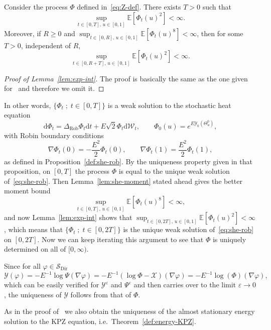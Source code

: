 \documentclass[AHL,Unicode,longabstracts]{cedram}
\DeclareMathOperator{\Dir}{Dir}
\DeclareMathOperator{\Rob}{Rob}
\newcommand{\bb}[1]{{\mathbb #1}}
\newcommand{\mc}[1]{{\mathcal #1}}
\renewcommand{\mc}[1]{{\mathcal #1}}
\newcommand{\Ctwo}{\ensuremath{\mc S_{\Dir}}}
\renewcommand{\ge}{\geqslant}
\newcommand*{\dd}{\mathrm{d}}
\newcommand*{\dt}{\dd t}
\begin{document}
\begin{lemm}\label{lem:exp-int}
Consider the process $\Phi$ defined in~\eqref{eq:Z-def}. There exists $T>0$ such that
\[
\sup_{t \in [0,T], \, u\in [0,1]}\bb E[\Phi_t(u)^2] < \infty.
\]
Moreover, if $R\ge 0$ and $\sup_{t \in [0,R], \, u\in [0,1]} \bb E[\Phi_t(u)^{8}] < \infty$, then for some $T > 0$, independent of $R$,
\[
\sup_{t \in [0,R+T], \, u\in [0,1]} \bb E[\Phi_t(u)^{2}] < \infty.
\]
\end{lemm}

\begin{proof}[Proof of Lemma~\ref{lem:exp-int}]
The proof is basically the same as the one given for~\cite[Lemma~B.1]{Gubinelli2015Energy} and therefore we omit it.
\end{proof}

In other words, $\{\Phi_t \; ; \; t \in [0,T]\}$ is a weak solution to the stochastic heat equation
\[
\dd \Phi_t = \Delta_{\Rob} \Phi_t \dt + E \sqrt{2} \Phi_t \dd \mc W_t, \qquad \Phi_0 (u) = e^{E \mc Y_0 (\Theta^0_u)},
\]
with Robin boundary conditions
\[
\nabla \Phi_t(0) = - \frac{E^2}{2} \Phi_t(0), \qquad \nabla \Phi_t(1) = \frac{E^2}{2} \Phi_t(1),
\]
as defined in Proposition~\ref{def:she-rob}. By the uniqueness property given in that proposition, on $[0,T]$ the process $\Phi$ is equal to the unique weak solution of~\eqref{eq:she-rob}. Then Lemma~\ref{lem:she-moment} stated ahead gives the better moment bound
\[
\sup_{t \in [0,T], \, u \in [0,1]} \bb E[\Phi_t(u)^8] < \infty,
\]
and now Lemma~\ref{lem:exp-int} shows that $\sup_{t \in [0,2T], \, u \in [0,1]} \bb E[\Phi_t(u)^2] < \infty$, which means that $\{\Phi_t \; ; \; t \in [0,2T]\}$ is the unique weak solution of~\eqref{eq:she-rob} on $[0,2T]$. Now we can keep iterating this argument to see that $\Phi$ is uniquely determined on all of $[0,\infty)$.

Since for all $\varphi \in \Ctwo$
\begin{equation}\label{eq:lognabla}
\mc Y(\varphi) = - E^{-1} \log \Psi (\nabla \varphi) = - E^{- 1} (\log \Phi- \mc X)(\nabla \varphi) = - E^{- 1} \log (\Phi) (\nabla \varphi),
\end{equation}
which can be easily verified for $\mc Y^\varepsilon$ and $\Psi^\varepsilon$ and then carries over to the limit $\varepsilon \to 0$, the uniqueness of $\mc Y$ follows from that of $\Phi$.

As in the proof of~\cite[Theorem~2.10]{Gubinelli2015Energy} we also obtain the uniqueness of the almost stationary energy solution to the KPZ equation, i.e.~Theorem~\ref{def:energy-KPZ}.
\end{document}
